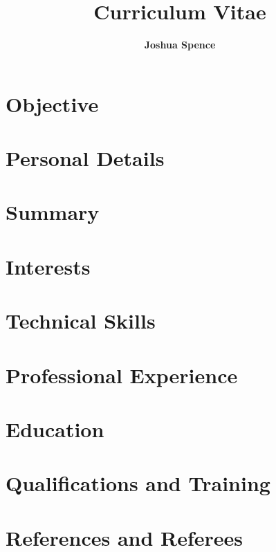 \documentclass{article}
\title{\Huge{\textbf{Curriculum Vitae}}}
\author{\Large{\textbf{Joshua Spence}}}
\date{}
\newcommand{\cvsection}[2]{
  \section*{#1}
  
}
\begin{document}
\maketitle

\cvsection{Objective}{objective}
\cvsection{Personal Details}{personal}
\cvsection{Summary}{summary}
\cvsection{Interests}{interests}
\cvsection{Technical Skills}{skills}
\cvsection{Professional Experience}{experience}
\cvsection{Education}{education}
\cvsection{Qualifications and Training}{qualifications}
\cvsection{References and Referees}{references}
\end{document}
